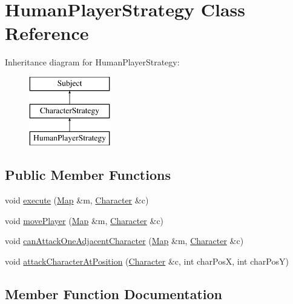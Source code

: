 \hypertarget{class_human_player_strategy}{}\section{Human\+Player\+Strategy Class Reference}
\label{class_human_player_strategy}
Inheritance diagram for Human\+Player\+Strategy\+:\begin{figure}[H]
\begin{center}
\leavevmode
\includegraphics[height=3.000000cm]{class_human_player_strategy}
\end{center}
\end{figure}
\subsection*{Public Member Functions}
\begin{DoxyCompactItemize}
\item 
void \hyperlink{class_human_player_strategy_a6bd8ba3a590ee457282f57074d66809d}{execute} (\hyperlink{class_map}{Map} \&m, \hyperlink{class_character}{Character} \&c)
\item 
void \hyperlink{class_human_player_strategy_a2697fde934ee29e34a03191b7002726b}{move\+Player} (\hyperlink{class_map}{Map} \&m, \hyperlink{class_character}{Character} \&c)
\item 
void \hyperlink{class_human_player_strategy_ae2f29f9c391c7d8531f9df1c57c8dacf}{can\+Attack\+One\+Adjacent\+Character} (\hyperlink{class_map}{Map} \&m, \hyperlink{class_character}{Character} \&c)
\item 
void \hyperlink{class_human_player_strategy_ab3050fd752d889f2b99ebe25e629e6eb}{attack\+Character\+At\+Position} (\hyperlink{class_character}{Character} \&c, int char\+PosX, int char\+PosY)
\end{DoxyCompactItemize}


\subsection{Member Function Documentation}
\hypertarget{class_human_player_strategy_ab3050fd752d889f2b99ebe25e629e6eb}{}\label{class_human_player_strategy_ab3050fd752d889f2b99ebe25e629e6eb} 
